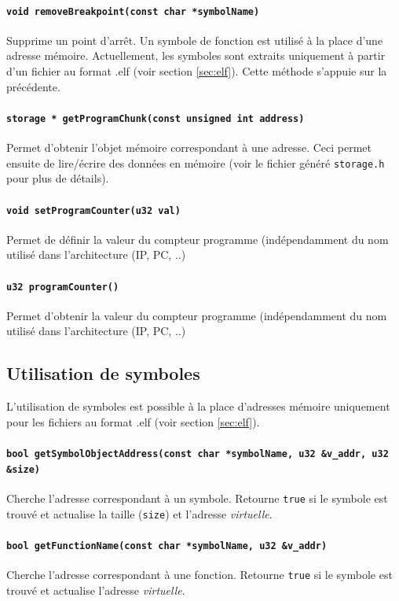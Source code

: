 \paragraph{\texttt{void removeBreakpoint(const char *symbolName)}} Supprime un point d'arrêt. Un symbole de fonction est utilisé à la place d'une adresse mémoire. Actuellement, les symboles sont extraits uniquement à partir d'un fichier au format .elf (voir section \ref{sec:elf}). Cette méthode s'appuie sur la précédente.

\paragraph{\texttt{storage * getProgramChunk(const unsigned int address)}} Permet d'obtenir l'objet mémoire correspondant à une adresse. Ceci permet ensuite de lire/écrire des données en mémoire (voir le fichier généré \texttt{storage.h} pour plus de détails).
\paragraph{\texttt{void setProgramCounter(u32 val)}} Permet de définir la valeur du compteur programme (indépendamment du nom utilisé dans l'architecture (IP, PC, ..)
\paragraph{\texttt{u32 programCounter()}} Permet d'obtenir la valeur du compteur programme (indépendamment du nom utilisé dans l'architecture (IP, PC, ..)

\subsection{Utilisation de symboles}
L'utilisation de symboles est possible à la place d'adresses mémoire uniquement pour les fichiers au format .elf (voir section \ref{sec:elf}).

\paragraph{\texttt{bool getSymbolObjectAddress(const char *symbolName, u32 \&v\_addr, u32 \&size)}} Cherche l'adresse correspondant à un symbole. Retourne \texttt{true} si le symbole est trouvé et actualise la taille (\texttt{size}) et l'adresse \emph{virtuelle}.
\paragraph{\texttt{bool getFunctionName(const char *symbolName, u32 \&v\_addr)}} Cherche l'adresse correspondant à une fonction. Retourne \texttt{true} si le symbole est trouvé et actualise l'adresse \emph{virtuelle}.
